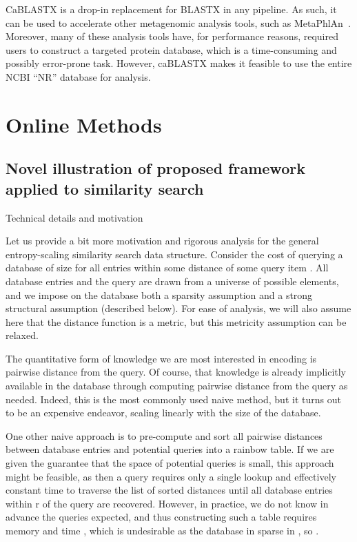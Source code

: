 \documentclass{amsbook}
\theoremstyle{definition}
\theoremstyle{remark}
\numberwithin{equation}{section}
\begin{document}
CaBLASTX is a drop-in replacement for BLASTX in any pipeline.
As such, it can be used to accelerate other metagenomic analysis tools, such
as MetaPhlAn~\cite{blah}.
Moreover, many of these analysis tools have, for performance reasons, required
users to construct a targeted protein database, which is a time-consuming and
possibly error-prone task.
However, caBLASTX makes it feasible to use the entire NCBI ``NR'' database for
analysis.

\chapter{Online Methods}

\section{Novel illustration of proposed framework applied to similarity search}

Technical details and motivation

Let us provide a bit more motivation and rigorous analysis for the general entropy-scaling similarity search data structure.
Consider the cost of querying a database of size  for all entries within some distance  of some query item .
All database entries and the query are drawn from a universe  of possible elements, and we impose on the database both a sparsity assumption and a strong structural assumption (described below).
For ease of analysis, we will also assume here that the distance function is a metric, but this metricity assumption can be relaxed.

The quantitative form of knowledge we are most interested in encoding is pairwise distance from the query.
Of course, that knowledge is already implicitly available in the database through computing pairwise distance from the query as needed.
Indeed, this is the most commonly used naive method, but it turns out to be an expensive endeavor, scaling linearly with the size of the database.

One other naive approach is to pre-compute and sort all pairwise distances between database entries and potential queries into a rainbow table.
If we are given the guarantee that the space of potential queries is small, this approach might be feasible, as then a query requires only a single lookup and effectively constant time to traverse the list of sorted distances until all database entries within r of the query are recovered.
However, in practice, we do not know in advance the queries expected, and thus constructing such a table requires memory  and time , which is undesirable as the database in sparse in , so .
\end{document}
